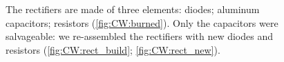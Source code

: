 \begin{refsection}
\begin{figure}[ht]
\hfill
{}
\caption{The rectifiers are made of three elements: diodes; aluminum capacitors; resistors (\ref{fig:CW:burned}). Only the capacitors were salvageable: we re-assembled the rectifiers with new diodes and resistors (\ref{fig:CW:rect_build}; \ref{fig:CW:rect_new}).}
\label{fig:CW:fixed}
\end{figure}

\printbibliography[title=Bibliography on MEG II]
\end{refsection}
